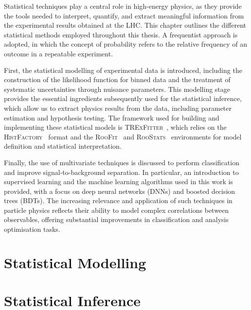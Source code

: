 
Statistical techniques play a central role in high-energy physics, as they provide the tools needed to interpret, quantify, and extract meaningful information from the experimental results obtained at the LHC. This chapter outlines the different statistical methods employed throughout this thesis. A frequentist approach is adopted, in which the concept of probability refers to the relative frequency of an outcome in a repeatable experiment.

First, the statistical modelling of experimental data is introduced, including the construction of the likelihood function for binned data and the treatment of systematic uncertainties through nuisance parameters. This modelling stage provides the essential ingredients subsequently used for the statistical inference, which allow us to extract physics results from the data, including parameter estimation and hypothesis testing. The framework used for building and implementing these statistical models is \textsc{TRExFitter}~\cite{trexfitter}, which relies on the \textsc{HistFactory}~\cite{histfactory} format and the \textsc{RooFit}~\cite{roofit} and \textsc{RooStats}~\cite{roostats} environments for model definition and statistical interpretation.

Finally, the use of multivariate techniques is discussed to perform classification and improve signal-to-background separation. In particular, an introduction to supervised learning and the machine learning algorithms used in this work is provided, with a focus on deep neural networks (DNNs) and boosted decision trees (BDTs). The increasing relevance and application of such techniques in particle physics reflects their ability to model complex correlations between observables, offering substantial improvements in classification and analysis optimisation tasks.

\section{Statistical Modelling}
\label{sec:stat_modelling}

\section{Statistical Inference}
\label{sec:stat_inference}

